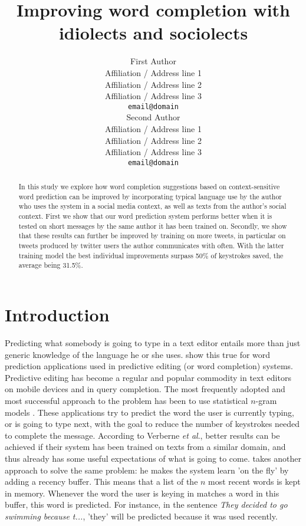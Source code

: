\documentclass[11pt]{article}
\title{Improving word completion with idiolects and sociolects}
\author{First Author \\
  Affiliation / Address line 1 \\
  Affiliation / Address line 2 \\
  Affiliation / Address line 3 \\
  {\tt email@domain} \\\And
  Second Author \\
  Affiliation / Address line 1 \\
  Affiliation / Address line 2 \\
  Affiliation / Address line 3 \\
  {\tt email@domain} \\}
\date{}
\begin{document}
\maketitle

\begin{abstract} 
In this study we explore how word completion suggestions based on context-sensitive word prediction can be improved by incorporating typical language use by the author who uses the system in a social media context, as well as texts from the author's social context. First we show that our word prediction system performs better when it is tested on short messages by the same author it has been trained on. Secondly, we show that these results can further be improved by training on more tweets, in particular on tweets produced by twitter users the author communicates with often. With the latter training model the best individual improvements surpass 50\% of keystrokes saved, the average being 31.5\%.


\end{abstract}

\section{Introduction}
Predicting what somebody is going to type in a text editor entails more than just generic knowledge of the language he or she uses.  show this true for word prediction applications used in predictive editing (or word completion) systems. Predictive editing has become a regular and popular commodity in text editors on mobile devices and in query completion. The most frequently adopted and most successful approach to the problem has been to use statistical $n$-gram models \cite{Lesher+99,Nantais+01,Matiasek+02,Fazly+03,How+05,Tanaka-Ishii07}. These applications try to predict the word the user is currently typing, or is going to type next, with the goal to reduce the number of keystrokes needed to complete the message. According to Verberne {\it et al}., better results can be achieved if their system has been trained on texts from a similar domain, and thus already has some useful expectations of what is going to come.  takes another approach to solve the same problem: he makes the system learn 'on the fly' by adding a recency buffer. This means that a list of the $n$ most recent words is kept in memory. Whenever the word the user is keying in matches a word in this buffer, this word is predicted. For instance, in the sentence \emph{They decided to go swimming because t...}, 'they' will be predicted because it was used recently.
\end{document}
